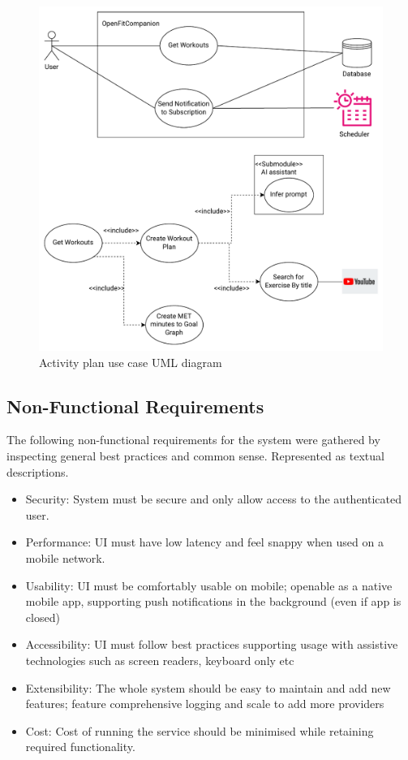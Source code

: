 \begin{figure}
    
    \centering
    \includegraphics[width=\textwidth,height=\textheight,keepaspectratio]{../images/workouts.pdf}
    \caption{Activity plan use case UML diagram}
    \label{fig:6}
    
\end{figure}
\subsection{Non-Functional Requirements}
The following non-functional requirements for the system were gathered by inspecting general best practices and common sense. Represented as textual descriptions. 
\begin{itemize}
    \item Security: System must be secure and only allow access to the authenticated user. 
    \item Performance: UI must have low latency and feel snappy when used on a mobile network. 
    \item Usability: UI must be comfortably usable on mobile; openable as a native mobile app, supporting push notifications in the background (even if app is closed)
    \item Accessibility: UI must follow best practices supporting usage with assistive technologies such as screen readers, keyboard only etc
    \item Extensibility: The whole system should be easy to maintain and add new features; feature comprehensive logging and scale to add more providers
    \item Cost: Cost of running the service should be minimised while retaining required functionality.
\end{itemize}
